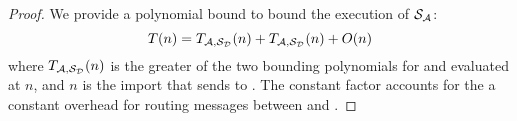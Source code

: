 \begin{proof}
We provide a polynomial bound to bound the execution of $\mathcal{S}_\mathcal{A}$:
\[
T(n) = T_{\mathcal{A},\mathcal{S}_{\mathcal{D}}}(n) + T_{\mathcal{A},\mathcal{S}_{\mathcal{D}}}(n) + O(n)
\]
where $T_{\mathcal{A},\mathcal{S}_{\mathcal{D}}}(n)$ is the greater of the two bounding polynomials for \Dummysim and \Adversary evaluated at $n$, and $n$ is the import that \Environment sends to \Adversary. 
The constant factor accounts for the a constant overhead for routing messages between \Dummysim and \Adversary.


%
%
%
%
%
%




\end{proof}
